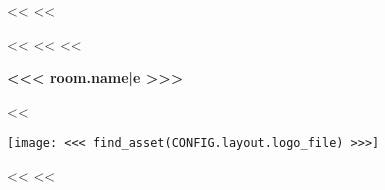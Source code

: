 <<%
<<%

<<%
    <<%
        <<%
            \begin{minipage}[t][2cm][c]{\textwidth-3.5cm}%
                \vspace{0pt}
                \raggedright
                \headingfamily\bfseries\Large{}<<< room.name|e >>>
            \end{minipage}%
            \hspace{0.5cm}%
            <<%
                \begin{minipage}[t]{3cm}%
                    \vspace{0pt}
                    \raggedleft
                    \texttt{[image: <<< find\_asset(CONFIG.layout.logo\_file) >>>]}
                \end{minipage}%
            <<%
            \renewcommand{\rightmark}{<<< room.name|e >>>}
            \thispagestyle{plain}
        <<%

